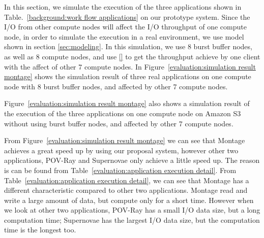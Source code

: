  In this section, we simulate the execution of the three applications shown in
 Table.~\ref{background:work flow applications} on our prototype system.
 Since the I/O from other compute nodes will affect the I/O throughput of one compute node,
 in order to simulate the execution in a real environment, we use model shown in section
 \ref{sec:modeling}.
 In this simulation, we use 8 burst buffer nodes, as well as 8 compute nodes, and use \ref{} to get
 the throughput achieve by one client with the affect of other 7 compute nodes.
 In Figure~\ref{evaluation:simulation result montage} shows the simulation result of three real
 applications on one compute node with 8 burst buffer nodes, and affected by other 7 compute nodes.
 
 Figure~\ref{evaluation:simulation result montage} also shows a simulation result of the execution
 of the three applications on one compute node on Amazon S3 without using burst buffer nodes, and
 affected by other 7 compute nodes.
 
 From Figure~\ref{evaluation:simulation result montage} we can see that Montage achieves a great
 speed up by using our proposal system, however other two applications, POV-Ray and Supernovae only
 achieve a little speed up.
 The reason is can be found from Table~\ref{evaluation:application execution detail}.
 From Table~\ref{evaluation:application execution detail}, we can see that Montage has a different
 characteristic compared to other two applications.
 Montage read and write a large amount of data, but compute only for a short time.
 However when we look at other two applications, POV-Ray has a small I/O data size, but a long
 computation time; Supernovae has the largest I/O data size, but the computation time is the longest
 too.
 
